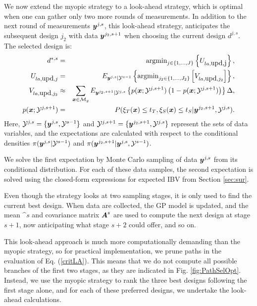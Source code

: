 \documentclass[aoas]{imsart}
\begin{document}
We now extend the myopic strategy to a look-ahead strategy, which is
optimal when one can gather only two more rounds of measurements. In
addition to the next round of measurements ${\boldsymbol y}^{j,s}$, this
look-ahead strategy, anticipates the subsequent design $j_2$ with
data ${\boldsymbol y}^{j_2,s+1}$ when choosing the current design $d^{j,s}$.  The
selected design is:
\begin{eqnarray}\label{critLA}
    d^{*,s} &=& \mbox{argmin}_{j \in \{1,\ldots,J\}} \left\{ U_{la,\mbox{upd,j}} \right\},  \\
    U_{la,\mbox{upd},j} & = &  E_{\by^{j,s}|\mathcal{Y}^{s-1}} \left\{ \mbox{argmin}_{j_2 \in \{1,\ldots,{J}_2\}} \left[ V_{la,\mbox{upd},j_2} \right] \right\}, \nonumber \\
V_{la,\mbox{upd},j_2} & \approx & \sum_{\bx \in \mathcal{M}_g} E_{\by^{j_2,s+1}|\mathcal{Y}^{j,s}} \left\{ p(\bx;\mathcal{Y}^{j,s+1})\left( 1-p(\bx;\mathcal{Y}^{j,s+1})\right) \right\} \Delta, \nonumber \\
    p(\bx;\mathcal{Y}^{j,s+1}) &=& P(\xi_T(\bx) \leq t_T, \xi_S(\bx) \leq t_S |\by^{j_2,s+1},\mathcal{Y}^{j,s}). \nonumber
\end{eqnarray}
Here, $\mathcal{Y}^{j,s}=\{{\boldsymbol y}^{j,s},\mathcal{Y}^{s-1}\}$ and
$\mathcal{Y}^{j,s+1}=\{{\boldsymbol y}^{j_2,s+1},\mathcal{Y}^{j,s}\}$ represent
the sets of data variables, and the expectations are calculated with respect to
the conditional densities $\pi({\boldsymbol y}^{j,s}|\mathcal{Y}^{s-1})$ and
$\pi({\boldsymbol y}^{j_2,s+1}|{\boldsymbol y}^{j,s},\mathcal{Y}^{s-1})$.

We solve the
first expectation by Monte Carlo sampling of data ${\boldsymbol y}^{j,s}$ from its
conditional distribution. For each of these data samples, the second expectation
is solved using the closed-form expressions for expected IBV from
Section \ref{sec:sur}.

Even though the strategy looks at two sampling stages, it is only used to find
the current best design. When data are collected, the GP model is
updated, and the mean $\bm^{s}$ and covariance matrix ${\boldsymbol A}^{s}$ are
used to compute the next design at stage $s+1$, now anticipating what
stage $s+2$ could offer, and so on.

This look-ahead approach is much more computationally demanding than
the myopic strategy, so for practical implementation, we prune paths
in the evaluation of Eq. (\ref{critLA}). This means that we do not
compute all possible branches of the first two stages, as they are
indicated in Fig. \ref{fig:PathSelOpt}. Instead, we use the myopic
strategy to rank the three best designs following the first stage alone, and
for each of these preferred designs, we undertake the look-ahead calculations.
\end{document}
